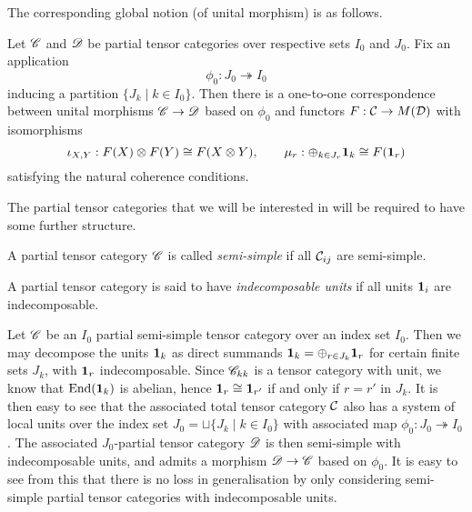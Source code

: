 The corresponding global notion (of unital morphism) is as follows.

\begin{Lem} Let $\mathscr{C}$ and $\mathscr{D}$ be partial tensor categories over respective sets $I_0$ and $J_0$. Fix an application \[\phi_0: J_0\twoheadrightarrow I_0\] inducing a partition $\{J_k\mid k\in I_0\}$. Then there is a one-to-one correspondence between unital morphisms $\mathscr{C}\rightarrow \mathscr{D}$ based on $\phi_0$ and functors $F:\mathcal{C} \rightarrow M(\mathcal{D})$ with isomorphisms \[\iota_{X,Y}:F(X)\otimes F(Y)\cong F(X\otimes Y),\qquad \mu_r:\oplus_{k\in J_r} \mathbf{1}_k \cong F(\mathbf{1}_r)\] satisfying the natural coherence conditions. 
\end{Lem} 

The partial tensor categories that we will be interested in will be required to have some further structure. 


\begin{Def} A partial tensor category $\mathscr{C}$ is called \emph{semi-simple} if all $\mathcal{C}_{ij}$ are semi-simple. 

A partial tensor category is said to have \emph{indecomposable units} if all units $\mathbf{1}_i$ are indecomposable. 
\end{Def}

Let $\mathscr{C}$ be an $I_0$ partial semi-simple tensor category over an index set $I_0$. Then we may decompose the units $\mathbf{1}_k$ as direct summands $\mathbf{1}_k = \oplus_{r\in J_k} \mathbf{1}_r$ for certain finite sets $J_k$, with $\mathbf{1}_r$ indecomposable. Since $\mathscr{C}_{kk}$ is a tensor category with unit, we know that $\operatorname{\mathrm{End}}(\mathbf{1}_k)$ is abelian, hence $\mathbf{1}_r\cong \mathbf{1}_{r'}$ if and only if $r=r'$ in $J_k$. It is then easy to see that the associated total tensor category $\mathcal{C}$ also has a system of local units over the index set $J_0=\sqcup\{J_k\mid k\in I_0\}$ with associated map $\phi_0:J_0 \twoheadrightarrow I_0$. The associated $J_0$-partial tensor category $\mathscr{D}$ is then semi-simple with indecomposable units, and admits a morphism $\mathscr{D}\rightarrow \mathscr{C}$ based on $\phi_0$. It is easy to see from this that there is no loss in generalisation by only considering semi-simple partial tensor categories with indecomposable units.
 

